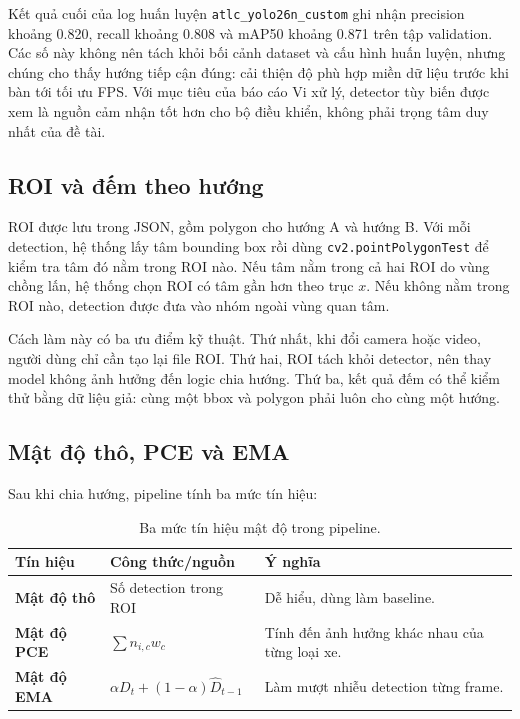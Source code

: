 Kết quả cuối của log huấn luyện \texttt{atlc\_yolo26n\_custom} ghi nhận precision khoảng 0.820, recall khoảng 0.808 và mAP50 khoảng 0.871 trên tập validation. Các số này không nên tách khỏi bối cảnh dataset và cấu hình huấn luyện, nhưng chúng cho thấy hướng tiếp cận đúng: cải thiện độ phù hợp miền dữ liệu trước khi bàn tới tối ưu FPS. Với mục tiêu của báo cáo Vi xử lý, detector tùy biến được xem là nguồn cảm nhận tốt hơn cho bộ điều khiển, không phải trọng tâm duy nhất của đề tài.

\subsection{ROI và đếm theo hướng}

ROI được lưu trong JSON, gồm polygon cho hướng A và hướng B. Với mỗi detection, hệ thống lấy tâm bounding box rồi dùng \texttt{cv2.pointPolygonTest} để kiểm tra tâm đó nằm trong ROI nào. Nếu tâm nằm trong cả hai ROI do vùng chồng lấn, hệ thống chọn ROI có tâm gần hơn theo trục \(x\). Nếu không nằm trong ROI nào, detection được đưa vào nhóm ngoài vùng quan tâm.


Cách làm này có ba ưu điểm kỹ thuật. Thứ nhất, khi đổi camera hoặc video, người dùng chỉ cần tạo lại file ROI. Thứ hai, ROI tách khỏi detector, nên thay model không ảnh hưởng đến logic chia hướng. Thứ ba, kết quả đếm có thể kiểm thử bằng dữ liệu giả: cùng một bbox và polygon phải luôn cho cùng một hướng.

\subsection{Mật độ thô, PCE và EMA}

Sau khi chia hướng, pipeline tính ba mức tín hiệu:

\begin{table}[H]
\centering
\caption{Ba mức tín hiệu mật độ trong pipeline.}
\label{tab:density-levels}
\small
\begin{tabularx}{\linewidth}{>{\bfseries}p{3.4cm}YY}
\toprule
Tín hiệu & Công thức/nguồn & Ý nghĩa \\
\midrule
Mật độ thô & Số detection trong ROI & Dễ hiểu, dùng làm baseline. \\
Mật độ PCE & \(\sum n_{i,c}w_c\) & Tính đến ảnh hưởng khác nhau của từng loại xe. \\
Mật độ EMA & \(\alpha D_t + (1-\alpha)\hat{D}_{t-1}\) & Làm mượt nhiễu detection từng frame. \\
\bottomrule
\end{tabularx}
\normalsize
\end{table}

